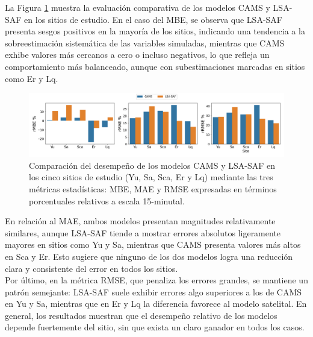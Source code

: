 La Figura \ref{fig:general-15} muestra la evaluación comparativa de los modelos CAMS y LSA-SAF en los sitios de estudio. En el caso del MBE, se observa que LSA-SAF presenta sesgos positivos en la mayoría de los sitios, indicando una tendencia a la sobreestimación sistemática de las variables simuladas, mientras que CAMS exhibe valores más cercanos a cero o incluso negativos, lo que refleja un comportamiento más balanceado, aunque con subestimaciones marcadas en sitios como Er y Lq.


\begin{figure}
    \centering
    \includegraphics[width=\linewidth]{figuras/errors_15.png}
    \caption{Comparación del desempeño de los modelos CAMS y LSA-SAF en los cinco sitios de estudio (Yu, Sa, Sca, Er y Lq) mediante las tres métricas estadísticas: MBE, MAE y RMSE expresadas en términos porcentuales relativos a escala 15-minutal.}
    \label{fig:general-15}
\end{figure}

En relación al MAE, ambos modelos presentan magnitudes relativamente similares, aunque LSA-SAF tiende a mostrar errores absolutos ligeramente mayores en sitios como Yu y Sa, mientras que CAMS presenta valores más altos en Sca y Er. Esto sugiere que ninguno de los dos modelos logra una reducción clara y consistente del error en todos los sitios.\\

Por último, en la métrica RMSE, que penaliza los errores grandes, se mantiene un patrón semejante: LSA-SAF suele exhibir errores algo superiores a los de CAMS en Yu y Sa, mientras que en Er y Lq la diferencia favorece al modelo satelital. En general, los resultados muestran que el desempeño relativo de los modelos depende fuertemente del sitio, sin que exista un claro ganador en todos los casos.\\


